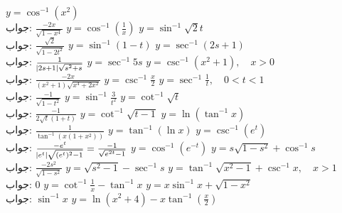 $y=\cos^{-1}(x^2)$\\
جواب:\quad
$\tfrac{-2x}{\sqrt{1-x^4}}$
$y=\cos^{-1}(\tfrac{1}{x})$
$y=\sin^{-1}\sqrt{2}t$\\
جواب:\quad
$\tfrac{\sqrt{2}}{\sqrt{1-2t^2}}$
$y=\sin^{-1}(1-t)$
$y=\sec^{-1}(2s+1)$\\
جواب:\quad
$\tfrac{1}{\abs{2s+1}\sqrt{s^2+s}}$
$y=\sec^{-1}5s$
$y=\csc^{-1}(x^2+1),\quad x>0$\\
جواب:\quad
$\tfrac{-2x}{(x^2+1)\sqrt{x^4+2x^2}}$
$y=\csc^{-1}\tfrac{x}{2}$
$y=\sec^{-1}\tfrac{1}{t},\quad 0<t<1$\\
جواب:\quad
$\tfrac{-1}{\sqrt{1-t^2}}$
$y=\sin^{-1}\tfrac{3}{t^2}$
$y=\cot^{-1}\sqrt{t}$\\
جواب:\quad
$\tfrac{-1}{2\sqrt{t}(1+t)}$
$y=\cot^{-1}\sqrt{t-1}$
$y=\ln(\tan^{-1}x)$\\
جواب:\quad
$\tfrac{1}{\tan^{-1}(x(1+x^2))}$
$y=\tan^{-1}(\ln x)$
$y=\csc^{-1}(e^t)$\\
جواب:\quad
$\tfrac{-e^t}{\abs{e^t}\sqrt{(e^t)^2-1}}=\tfrac{-1}{\sqrt{e^{2t}-1}}$
$y=\cos^{-1}(e^{-t})$
$y=s\sqrt{1-s^2}+\cos^{-1}s$\\
جواب:\quad
$\tfrac{-2s^2}{\sqrt{1-s^2}}$
$y=\sqrt{s^2-1}-\sec^{-1}s$
$y=\tan^{-1}\sqrt{x^2-1}+\csc^{-1}x,\quad x>1$\\
جواب:\quad
$0$
$y=\cot^{-1}\tfrac{1}{x}-\tan^{-1}x$
$y=x\sin^{-1}x+\sqrt{1-x^2}$\\
جواب:\quad
$\sin^{-1}x$
$y=\ln(x^2+4)-x\tan^{-1}(\tfrac{x}{2})$

